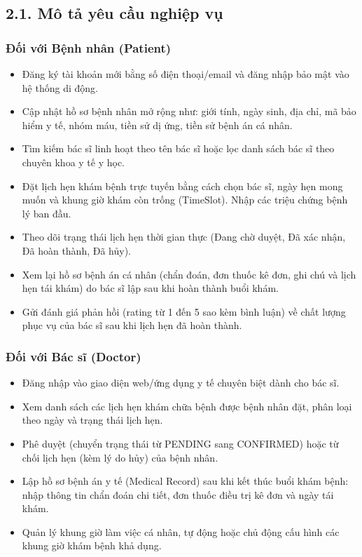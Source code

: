 \documentclass[12pt,a4paper]{report}
\begin{document}
\subsection*{2.1. Mô tả yêu cầu nghiệp vụ}
\subsubsection*{Đối với Bệnh nhân (Patient)}
\begin{itemize}
    \item Đăng ký tài khoản mới bằng số điện thoại/email và đăng nhập bảo mật vào hệ thống di động.
    \item Cập nhật hồ sơ bệnh nhân mở rộng như: giới tính, ngày sinh, địa chỉ, mã bảo hiểm y tế, nhóm máu, tiền sử dị ứng, tiền sử bệnh án cá nhân.
    \item Tìm kiếm bác sĩ linh hoạt theo tên bác sĩ hoặc lọc danh sách bác sĩ theo chuyên khoa y tế y học.
    \item Đặt lịch hẹn khám bệnh trực tuyến bằng cách chọn bác sĩ, ngày hẹn mong muốn và khung giờ khám còn trống (TimeSlot). Nhập các triệu chứng bệnh lý ban đầu.
    \item Theo dõi trạng thái lịch hẹn thời gian thực (Đang chờ duyệt, Đã xác nhận, Đã hoàn thành, Đã hủy).
    \item Xem lại hồ sơ bệnh án cá nhân (chẩn đoán, đơn thuốc kê đơn, ghi chú và lịch hẹn tái khám) do bác sĩ lập sau khi hoàn thành buổi khám.
    \item Gửi đánh giá phản hồi (rating từ 1 đến 5 sao kèm bình luận) về chất lượng phục vụ của bác sĩ sau khi lịch hẹn đã hoàn thành.
\end{itemize}

\subsubsection*{Đối với Bác sĩ (Doctor)}
\begin{itemize}
    \item Đăng nhập vào giao diện web/ứng dụng y tế chuyên biệt dành cho bác sĩ.
    \item Xem danh sách các lịch hẹn khám chữa bệnh được bệnh nhân đặt, phân loại theo ngày và trạng thái lịch hẹn.
    \item Phê duyệt (chuyển trạng thái từ PENDING sang CONFIRMED) hoặc từ chối lịch hẹn (kèm lý do hủy) của bệnh nhân.
    \item Lập hồ sơ bệnh án y tế (Medical Record) sau khi kết thúc buổi khám bệnh: nhập thông tin chẩn đoán chi tiết, đơn thuốc điều trị kê đơn và ngày tái khám.
    \item Quản lý khung giờ làm việc cá nhân, tự động hoặc chủ động cấu hình các khung giờ khám bệnh khả dụng.
\end{itemize}
\end{document}
